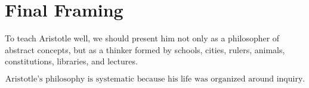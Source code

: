 \documentclass[12pt]{article}
\begin{document}
\section*{Final Framing}

To teach Aristotle well, we should present him not only as a philosopher of
abstract concepts, but as a thinker formed by schools, cities, rulers, animals,
constitutions, libraries, and lectures.

\[
\boxed{
\text{Aristotle's philosophy is systematic because his life was organized around inquiry.}
}
\]
\end{document}

